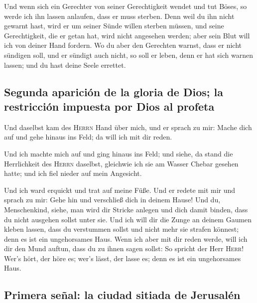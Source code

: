  Und wenn sich ein Gerechter von seiner Gerechtigkeit
wendet und tut Böses, so werde ich ihn lassen anlaufen, dass er muss
sterben. Denn weil du ihn nicht gewarnt hast, wird er um seiner Sünde
willen sterben müssen, und seine Gerechtigkeit, die er getan hat, wird
nicht angesehen werden; aber sein Blut will ich von deiner Hand fordern.
 Wo du aber den Gerechten warnst, dass er nicht sündigen
soll, und er sündigt auch nicht, so soll er leben, denn er hat sich
warnen lassen; und du hast deine Seele errettet.

\hypertarget{segunda-apariciuxf3n-de-la-gloria-de-dios-la-restricciuxf3n-impuesta-por-dios-al-profeta}{%
\subsection{Segunda aparición de la gloria de Dios; la restricción
impuesta por Dios al
profeta}\label{segunda-apariciuxf3n-de-la-gloria-de-dios-la-restricciuxf3n-impuesta-por-dios-al-profeta}}

 Und daselbst kam des \textsc{Herrn} Hand über mich, und
er sprach zu mir: Mache dich auf und gehe hinaus ins Feld; da will ich
mit dir reden.

 Und ich machte mich auf und ging hinaus ins Feld; und
siehe, da stand die Herrlichkeit des \textsc{Herrn} daselbst, gleichwie
ich sie am Wasser Chebar gesehen hatte; und ich fiel nieder auf mein
Angesicht.

 Und ich ward erquickt und trat auf meine Füße. Und er
redete mit mir und sprach zu mir: Gehe hin und verschließ dich in deinem
Hause!  Und du, Menschenkind, siehe, man wird dir Stricke
anlegen und dich damit binden, dass du nicht ausgehen sollst unter sie.
 Und ich will dir die Zunge an deinem Gaumen kleben
lassen, dass du verstummen sollst und nicht mehr sie strafen könnest;
denn es ist ein ungehorsames Haus.  Wenn ich aber mit dir
reden werde, will ich dir den Mund auftun, dass du zu ihnen sagen
sollst: So spricht der Herr \textsc{Herr}! Wer's hört, der höre es;
wer's lässt, der lasse es; denn es ist ein ungehorsames Haus.

\hypertarget{primera-seuxf1al-la-ciudad-sitiada-de-jerusaluxe9n}{%
\subsection{Primera señal: la ciudad sitiada de
Jerusalén}\label{primera-seuxf1al-la-ciudad-sitiada-de-jerusaluxe9n}}

